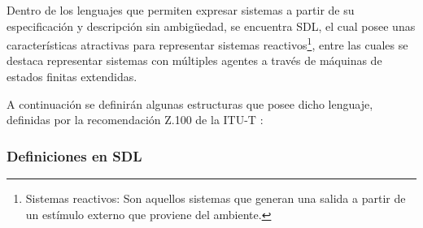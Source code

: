 Dentro de los lenguajes que permiten expresar sistemas a partir de su 
especificaci\'on y descripci\'on sin ambig\"uedad, se encuentra SDL, el cual 
posee unas caracter\'isticas atractivas para representar sistemas 
reactivos\footnote{Sistemas reactivos: Son aquellos sistemas que generan una 
salida a partir de  un est\'imulo externo que proviene del ambiente.}, entre 
las cuales se destaca representar sistemas con m\'ultiples agentes a trav\'es 
de m\'aquinas de estados finitas extendidas.

 A continuaci\'on se definir\'an algunas estructuras que posee dicho lenguaje, 
definidas por la recomendaci\'on Z.100 de la ITU-T \cite{SDL2002}: 

\subsubsection{Definiciones en SDL}
